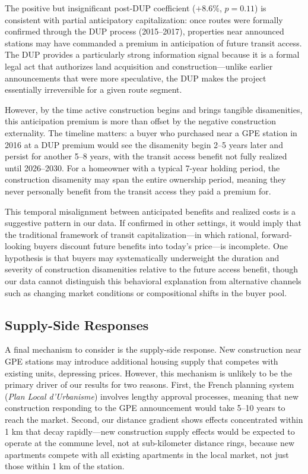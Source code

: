 \documentclass[12pt]{article}
\begin{document}
The positive but insignificant post-DUP coefficient ($+8.6\%$, $p = 0.11$) is consistent with partial anticipatory capitalization: once routes were formally confirmed through the DUP process (2015--2017), properties near announced stations may have commanded a premium in anticipation of future transit access. The DUP provides a particularly strong information signal because it is a formal legal act that authorizes land acquisition and construction---unlike earlier announcements that were more speculative, the DUP makes the project essentially irreversible for a given route segment.

However, by the time active construction begins and brings tangible disamenities, this anticipation premium is more than offset by the negative construction externality. The timeline matters: a buyer who purchased near a GPE station in 2016 at a DUP premium would see the disamenity begin 2--5 years later and persist for another 5--8 years, with the transit access benefit not fully realized until 2026--2030. For a homeowner with a typical 7-year holding period, the construction disamenity may span the entire ownership period, meaning they never personally benefit from the transit access they paid a premium for.

This temporal misalignment between anticipated benefits and realized costs is a suggestive pattern in our data. If confirmed in other settings, it would imply that the traditional framework of transit capitalization---in which rational, forward-looking buyers discount future benefits into today's price---is incomplete. One hypothesis is that buyers may systematically underweight the duration and severity of construction disamenities relative to the future access benefit, though our data cannot distinguish this behavioral explanation from alternative channels such as changing market conditions or compositional shifts in the buyer pool.

\subsection{Supply-Side Responses}

A final mechanism to consider is the supply-side response. New construction near GPE stations may introduce additional housing supply that competes with existing units, depressing prices. However, this mechanism is unlikely to be the primary driver of our results for two reasons. First, the French planning system (\textit{Plan Local d'Urbanisme}) involves lengthy approval processes, meaning that new construction responding to the GPE announcement would take 5--10 years to reach the market. Second, our distance gradient shows effects concentrated within 1 km that decay rapidly---new construction supply effects would be expected to operate at the commune level, not at sub-kilometer distance rings, because new apartments compete with all existing apartments in the local market, not just those within 1 km of the station.
\end{document}
